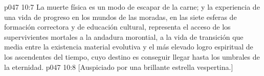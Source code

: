 \vs p047 10:7 \pc La muerte física es un modo de escapar de la carne; y la experiencia de una vida de progreso en los mundos de las moradas, en las siete esferas de formación correctora y de educación cultural, representa el acceso de los supervivientes mortales a la andadura morontial, a la vida de transición que media entre la existencia material evolutiva y el más elevado logro espiritual de los ascendentes del tiempo, cuyo destino es conseguir llegar hasta los umbrales de la eternidad.
\vsetoff
\vs p047 10:8 [Auspiciado por una brillante estrella vespertina.]
